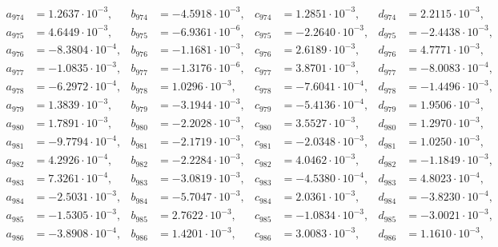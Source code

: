 \begin{align*}
  a_{ 974 } &= 1.2637 \cdot 10^{ -3 }, & b_{ 974 } &= -4.5918 \cdot 10^{ -3 }, & c_{ 974 } &= 1.2851 \cdot 10^{ -3 }, & d_{ 974 } &= 2.2115 \cdot 10^{ -3 }, \\ 
  a_{ 975 } &= 4.6449 \cdot 10^{ -3 }, & b_{ 975 } &= -6.9361 \cdot 10^{ -6 }, & c_{ 975 } &= -2.2640 \cdot 10^{ -3 }, & d_{ 975 } &= -2.4438 \cdot 10^{ -3 }, \\ 
  a_{ 976 } &= -8.3804 \cdot 10^{ -4 }, & b_{ 976 } &= -1.1681 \cdot 10^{ -3 }, & c_{ 976 } &= 2.6189 \cdot 10^{ -3 }, & d_{ 976 } &= 4.7771 \cdot 10^{ -3 }, \\ 
  a_{ 977 } &= -1.0835 \cdot 10^{ -3 }, & b_{ 977 } &= -1.3176 \cdot 10^{ -6 }, & c_{ 977 } &= 3.8701 \cdot 10^{ -3 }, & d_{ 977 } &= -8.0083 \cdot 10^{ -4 }, \\ 
  a_{ 978 } &= -6.2972 \cdot 10^{ -4 }, & b_{ 978 } &= 1.0296 \cdot 10^{ -3 }, & c_{ 978 } &= -7.6041 \cdot 10^{ -4 }, & d_{ 978 } &= -1.4496 \cdot 10^{ -3 }, \\ 
  a_{ 979 } &= 1.3839 \cdot 10^{ -3 }, & b_{ 979 } &= -3.1944 \cdot 10^{ -3 }, & c_{ 979 } &= -5.4136 \cdot 10^{ -4 }, & d_{ 979 } &= 1.9506 \cdot 10^{ -3 }, \\ 
  a_{ 980 } &= 1.7891 \cdot 10^{ -3 }, & b_{ 980 } &= -2.2028 \cdot 10^{ -3 }, & c_{ 980 } &= 3.5527 \cdot 10^{ -3 }, & d_{ 980 } &= 1.2970 \cdot 10^{ -3 }, \\ 
  a_{ 981 } &= -9.7794 \cdot 10^{ -4 }, & b_{ 981 } &= -2.1719 \cdot 10^{ -3 }, & c_{ 981 } &= -2.0348 \cdot 10^{ -3 }, & d_{ 981 } &= 1.0250 \cdot 10^{ -3 }, \\ 
  a_{ 982 } &= 4.2926 \cdot 10^{ -4 }, & b_{ 982 } &= -2.2284 \cdot 10^{ -3 }, & c_{ 982 } &= 4.0462 \cdot 10^{ -3 }, & d_{ 982 } &= -1.1849 \cdot 10^{ -3 }, \\ 
  a_{ 983 } &= 7.3261 \cdot 10^{ -4 }, & b_{ 983 } &= -3.0819 \cdot 10^{ -3 }, & c_{ 983 } &= -4.5380 \cdot 10^{ -4 }, & d_{ 983 } &= 4.8023 \cdot 10^{ -4 }, \\ 
  a_{ 984 } &= -2.5031 \cdot 10^{ -3 }, & b_{ 984 } &= -5.7047 \cdot 10^{ -3 }, & c_{ 984 } &= 2.0361 \cdot 10^{ -3 }, & d_{ 984 } &= -3.8230 \cdot 10^{ -4 }, \\ 
  a_{ 985 } &= -1.5305 \cdot 10^{ -3 }, & b_{ 985 } &= 2.7622 \cdot 10^{ -3 }, & c_{ 985 } &= -1.0834 \cdot 10^{ -3 }, & d_{ 985 } &= -3.0021 \cdot 10^{ -3 }, \\ 
  a_{ 986 } &= -3.8908 \cdot 10^{ -4 }, & b_{ 986 } &= 1.4201 \cdot 10^{ -3 }, & c_{ 986 } &= 3.0083 \cdot 10^{ -3 }, & d_{ 986 } &= 1.1610 \cdot 10^{ -3 }, \\ 

\end{align*}
